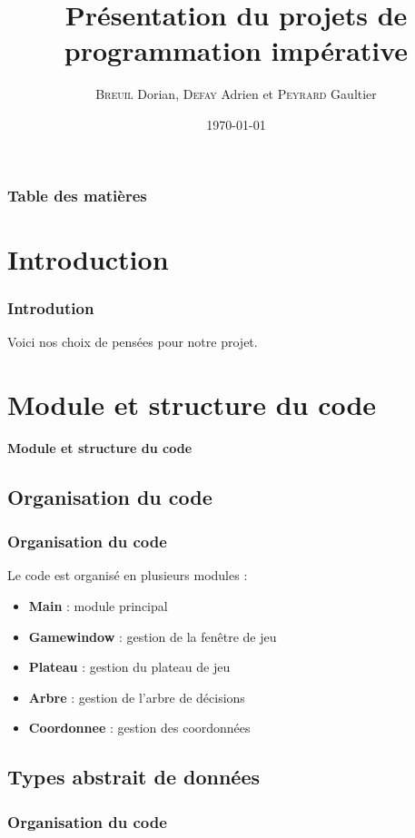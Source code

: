 \documentclass[9pt]{beamer}
\title{Présentation du projets de programmation impérative}
\author{\textsc{Breuil} Dorian, \textsc{Defay} Adrien et \textsc{Peyrard} Gaultier}
\date{\today}
\begin{document}
\frame{\titlepage}  %

\begin{frame}
  \frametitle{Table des matières}
  \tableofcontents
  
\end{frame}

\section{Introduction}
\begin{frame}
  \frametitle{Introdution}  %
  Voici nos choix de pensées pour notre projet.
\end{frame}

\section{Module et structure du code}
\begin{frame}
  \begin{center}
      \Large \textbf{Module et structure du code}
  \end{center}
\end{frame}

\begin{frame}
  \subsection{Organisation du code}
  \frametitle{Organisation du code}
  Le code est organisé en plusieurs modules :
  \begin{itemize}
  \item \textbf{Main} : module principal
  \item \textbf{Gamewindow} : gestion de la fenêtre de jeu
  \item \textbf{Plateau} : gestion du plateau de jeu
  \item \textbf{Arbre} : gestion de l’arbre de décisions
  \item \textbf{Coordonnee} : gestion des coordonnées
  \end{itemize}
\end{frame}

\begin{frame}
  \section{Types abstrait de données}
  \frametitle{Organisation du code}
\end{frame}
\end{document}
